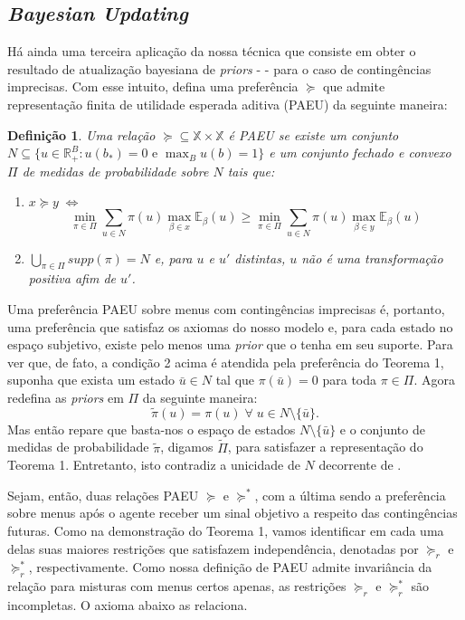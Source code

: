 \documentclass[12pt, a4paper]{article}
\theoremstyle{nonumberplain}
\theoremstyle{plain}
\theoremstyle{plain}
\theoremstyle{plain}
\theoremstyle{nonumberplain}
\newtheorem{defi}{Definição}
\begin{document}
\subsection{\emph{Bayesian Updating}}
Há ainda uma terceira aplicação da nossa técnica que consiste em obter o resultado de atualização bayesiana de \emph{priors} - \cite{Riella2013a} - para o caso de contingências imprecisas. Com esse intuito, defina uma preferência $\succcurlyeq$ que admite representação finita de utilidade esperada aditiva (PAEU) da seguinte maneira:

\begin{defi}
Uma relação $\succcurlyeq\subseteq\mathbb{X}\times\mathbb{X}$ é PAEU se existe um conjunto $N\subseteq \{u \in \mathbb{R}^B_+:u(b_*)=0\text { e }\max_{B}u(b)=1\}$ e um conjunto fechado e convexo $\Pi$ de medidas de probabilidade sobre $N$ tais que:
\begin{enumerate}[1.]
\item $x \succcurlyeq y \;\Leftrightarrow\;$ $$\min_{\pi\in\Pi}\sum_{u\in N} \pi(u)\max_{\beta\in x}\mathbb{E}_\beta(u)\geq \min_{\pi\in\Pi}\sum_{u\in N} \pi(u)\max_{\beta\in y}\mathbb{E}_\beta(u)$$
\item $\bigcup_{\pi\in\Pi}supp(\pi)=N$ e, para $u$ e $u'$ distintas, $u$ não é uma transformação positiva afim de $u'$.
\end{enumerate}
\end{defi}

Uma preferência PAEU sobre menus com contingências imprecisas é, portanto, uma preferência que satisfaz os axiomas do nosso modelo e, para cada estado no espaço subjetivo, existe pelo menos uma \emph{prior} que o tenha em seu suporte. Para ver que, de fato, a condição 2 acima é atendida pela preferência do Teorema 1, suponha que exista um estado $\bar{u}\in N$ tal que $\pi(\bar{u})=0$ para toda $\pi\in\Pi$. Agora redefina as \emph{priors} em $\Pi$ da seguinte maneira: $$\tilde{\pi}(u)=\pi(u)\;\forall\; u\in N\setminus\{\bar{u}\}.$$    
Mas então repare que basta-nos o espaço de estados $N\setminus\{\bar{u}\}$ e o conjunto de medidas de probabilidade $\tilde{\pi}$, digamos $\tilde{\Pi}$, para satisfazer a representação do Teorema 1. Entretanto, isto contradiz a unicidade de $N$ decorrente de \cite{Kochov2007}. 

Sejam, então, duas relações PAEU $\succcurlyeq$ e $\succcurlyeq^*$, com a última sendo a preferência sobre menus após o agente receber um sinal objetivo a respeito das contingências futuras. Como na demonstração do Teorema 1, vamos identificar em cada uma delas suas maiores restrições que satisfazem independência, denotadas por $\succcurlyeq_r$ e $\succcurlyeq^*_r$, respectivamente. Como nossa definição de PAEU admite invariância da relação para misturas com menus certos apenas, as restrições $\succcurlyeq_r$ e $\succcurlyeq^*_r$ são incompletas. O axioma abaixo as relaciona.
\end{document}
